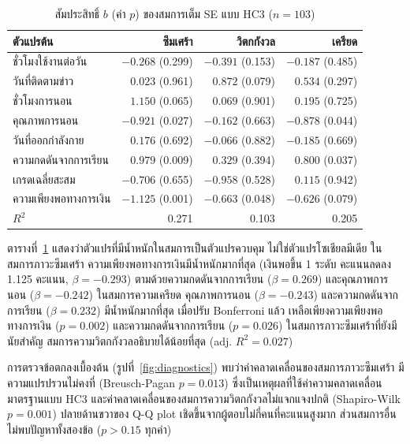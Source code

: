 \begin{table}[H]
\centering
\caption{สัมประสิทธิ์ $b$ (ค่า $p$) ของสมการเต็ม SE แบบ HC3 ($n = 103$)}
\label{tab:coef}
\begin{tabular}{|l|r|r|r|}
\hline
\textbf{ตัวแปรต้น} & \textbf{ซึมเศร้า} & \textbf{วิตกกังวล} & \textbf{เครียด} \\
\hline
ชั่วโมงใช้งานต่อวัน & $-0.268$ (0.299) & $-0.391$ (0.153) & $-0.187$ (0.485) \\
วันที่ติดตามข่าว & $0.023$ (0.961) & $0.872$ (0.079) & $0.534$ (0.297) \\
ชั่วโมงการนอน & $1.150$ (0.065) & $0.069$ (0.901) & $0.195$ (0.725) \\
คุณภาพการนอน & $-0.921$ (0.027) & $-0.162$ (0.663) & $-0.878$ (0.044) \\
วันที่ออกกำลังกาย & $0.176$ (0.692) & $-0.066$ (0.882) & $-0.185$ (0.669) \\
ความกดดันจากการเรียน & $0.979$ (0.009) & $0.329$ (0.394) & $0.800$ (0.037) \\
เกรดเฉลี่ยสะสม & $-0.706$ (0.655) & $-0.958$ (0.528) & $0.115$ (0.942) \\
ความเพียงพอทางการเงิน & $-1.125$ (0.001) & $-0.663$ (0.048) & $-0.626$ (0.079) \\
\hline
$R^2$ & 0.271 & 0.103 & 0.205 \\
\hline
\end{tabular}
\end{table}

ตารางที่~\ref{tab:coef} แสดงว่าตัวแปรที่มีน้ำหนักในสมการเป็นตัวแปรควบคุม ไม่ใช่ตัวแปรโซเชียลมีเดีย
ในสมการภาวะซึมเศร้า ความเพียงพอทางการเงินมีน้ำหนักมากที่สุด
(เงินพอขึ้น 1 ระดับ คะแนนลดลง 1.125 คะแนน, $\beta = -0.293$)
ตามด้วยความกดดันจากการเรียน ($\beta = 0.269$) และคุณภาพการนอน ($\beta = -0.242$)
ในสมการความเครียด คุณภาพการนอน ($\beta = -0.243$) และความกดดันจากการเรียน ($\beta = 0.232$) มีน้ำหนักมากที่สุด
เมื่อปรับ Bonferroni แล้ว เหลือเพียงความเพียงพอทางการเงิน ($p = 0.002$)
และความกดดันจากการเรียน ($p = 0.026$) ในสมการภาวะซึมเศร้าที่ยังมีนัยสำคัญ
สมการความวิตกกังวลอธิบายได้น้อยที่สุด (adj. $R^2 = 0.027$)

การตรวจข้อตกลงเบื้องต้น (รูปที่~\ref{fig:diagnostics}) พบว่าค่าคลาดเคลื่อนของสมการภาวะซึมเศร้า
มีความแปรปรวนไม่คงที่ (Breusch-Pagan $p = 0.013$) ซึ่งเป็นเหตุผลที่ใช้ค่าความคลาดเคลื่อนมาตรฐานแบบ HC3
และค่าคลาดเคลื่อนของสมการความวิตกกังวลไม่แจกแจงปกติ (Shapiro-Wilk $p = 0.001$)
ปลายด้านขวาของ Q-Q plot เชิดขึ้นจากผู้ตอบไม่กี่คนที่คะแนนสูงมาก
ส่วนสมการอื่นไม่พบปัญหาทั้งสองข้อ ($p > 0.15$ ทุกค่า)

